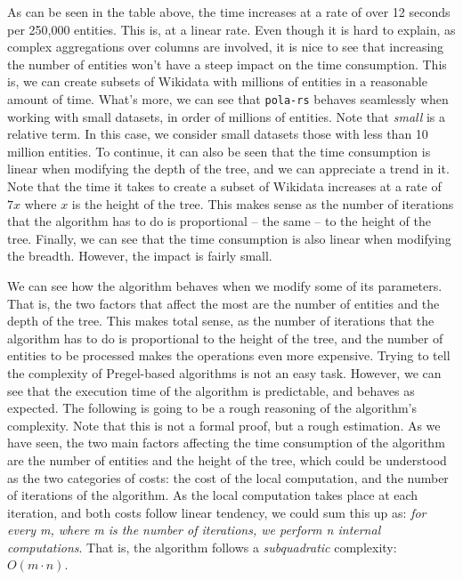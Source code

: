 \vspace*{-1em}

As can be seen in the table above, the time increases at a rate of over 12 seconds per 250,000 entities. This is, at a linear rate. Even though it is hard to explain, as complex aggregations over columns are involved, it is nice to see that increasing the number of entities won't have a steep impact on the time consumption. This is, we can create subsets of Wikidata with millions of entities in a reasonable amount of time. What's more, we can see that \texttt{pola-rs} behaves seamlessly when working with small datasets, in order of millions of entities. Note that \textit{small} is a relative term. In this case, we consider small datasets those with less than 10 million entities. To continue, it can also be seen that the time consumption is linear when modifying the depth of the tree,
and we can appreciate a trend in it. Note that the time it takes to create a subset of Wikidata increases at a rate of $7 x$ where $x$ is the height of the tree. This makes sense as the number of iterations that the algorithm has to do is proportional -- the same -- to the height of the tree. Finally, we can see that the time consumption is also linear when modifying the breadth. However, the impact is fairly small.

We can see how the algorithm behaves when we modify some of its parameters. That is, the two factors that affect the most are the number of entities and the depth of the tree. This makes total sense, as the number of iterations that the algorithm has to do is proportional to the height of the tree, and the number of entities to be processed makes the operations even more expensive. Trying to tell the complexity of Pregel-based algorithms is not an easy task. However, we can see that the execution time of the algorithm is predictable, and behaves as expected. The following is going to be a rough reasoning of the algorithm's complexity. Note that this is not a formal proof, but a rough estimation. As we have seen, the two main factors affecting the time consumption of the algorithm are the number of entities and the height of the tree, which could be understood as the two categories of costs: the cost of the local computation, and the number of iterations of the algorithm. As the local computation takes place at each iteration, and both costs follow linear tendency, we could sum this up as: \textit{for every m, where m is the number of iterations, we perform n internal computations}. That is, the algorithm follows a \textit{subquadratic} complexity: $O(m \cdot n)$.

